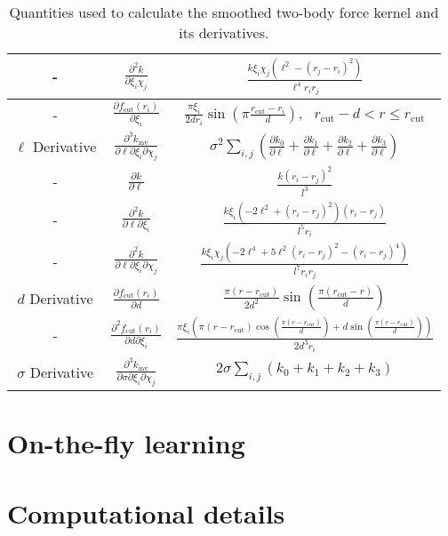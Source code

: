 \documentclass[%
superscriptaddress,
preprint,
amsmath,amssymb,
aps,
]{revtex4-1}
\begin{document}
\begin{center}
\begin{table}
\begin{tabular}{ |c|c|c| }
     - & $\frac{\partial^2 k}{\partial \xi_i \chi_j}$ & $\frac{k \xi_i \chi_j (\ell^2 - (r_j-r_i)^2)}{\ell^4 r_i r_j}$ \\ 
     \hline
     - & $\frac{\partial f_\text{cut}(r_i)}{\partial \xi_i}$ & $ \frac{\pi \xi_i}{2d r_i} \sin(\pi \frac{r_{\text{cut}}-r_i}{d}), \text{ } r_{\text{cut}} - d < r \le r_{\text{cut}}$ \\ 
     \hline
     $\ell$ Derivative & $\frac{\partial^3 k_{\text{inv}}}{\partial \ell \partial \xi_i \partial \chi_j}$ & $\sigma^2 \sum_{i ,j} \left(\frac{\partial k_0}{\partial \ell} + \frac{\partial k_1}{\partial \ell} + \frac{\partial k_2}{\partial \ell} + \frac{\partial k_3}{\partial \ell}\right)$ \\
     \hline
     - & $\frac{\partial k}{\partial \ell}$ & $\frac{k (r_i-r_j)^2}{l^3}$ \\
     \hline
     - & $\frac{\partial^2 k}{\partial \ell \partial \xi_i}$ & $\frac{k \xi_i (-2 \ell^2 + (r_i-r_j)^2) (r_i-r_j)}{l^5 r_i}$ \\
     \hline
     - & $\frac{\partial^2 k}{\partial \ell \partial \xi_i \partial \chi_j}$ & $\frac{k \xi_i \chi_j \left(-2 \ell^4 + 5 \ell^2 (r_i-r_j)^2 - (r_i-r_j)^4 \right)}{l^7 r_i r_j}$ \\
     \hline
     $d$ Derivative & $\frac{\partial f_{\text{cut}}(r_i)}{\partial d}$ & $\frac{\pi (r-r_{\text{cut}})}{2 d^2} \sin\left( \frac{\pi (r_{\text{cut}} - r)}{d} \right)$ \\
     \hline
     - & $\frac{\partial^2 f_{\text{cut}}(r_i)}{\partial d \partial \xi_i}$ & $\frac{\pi \xi_i \left( \pi (r - r_{\text{cut}}) \cos \left( \frac{\pi (r - r_{\text{cut}})}{d} \right) + d \sin \left( \frac{\pi (r-r_{\text{cut}})}{d} \right) \right)}{2 d^3 r_i}$\\
     \hline
     $\sigma$ Derivative & $\frac{\partial^3 k_{\text{inv}}}{\partial \sigma \partial \xi_i \partial \chi_j}$ & $2 \sigma \sum_{i ,j} (k_0 + k_1 + k_2 + k_3)$ \\
     \hline
    \end{tabular}
    \caption{Quantities used to calculate the smoothed two-body force kernel and its derivatives.}
\end{table}
\end{center}

\section{On-the-fly learning}

\section{Computational details}
\end{document}
